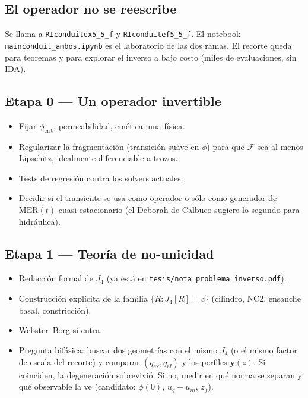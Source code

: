 \documentclass[11pt,a4paper]{article}
\theoremstyle{plain}
\theoremstyle{definition}
\theoremstyle{remark}
\newcommand{\MER}{\mathrm{MER}}
\newcommand{\F}{\mathcal{F}}
\begin{document}
\subsection{El operador no se reescribe}

Se llama a \texttt{RIconduitex5\_5\_f} y \texttt{RIconduitef5\_5\_f}.
El notebook \texttt{mainconduit\_ambos.ipynb} es el laboratorio de
las dos ramas. El recorte queda para teoremas y para explorar el
inverso a bajo costo (miles de evaluaciones, sin IDA).

\subsection{Etapa 0 --- Un operador invertible}

\begin{itemize}
\item Fijar $\phi_{\mathrm{crit}}$, permeabilidad, cinética: una
  física.
\item Regularizar la fragmentación (transición suave en $\phi$)
  para que $\F$ sea al menos Lipschitz, idealmente
  diferenciable a trozos.
\item Tests de regresión contra los solvers actuales.
\item Decidir si el transiente se usa como operador o sólo como
  generador de $\MER(t)$ cuasi-estacionario (el Deborah de
  Calbuco sugiere lo segundo para hidráulica).
\end{itemize}

\subsection{Etapa 1 --- Teoría de no-unicidad}

\begin{itemize}
\item Redacción formal de $J_4$ (ya está en
  \texttt{tesis/nota\_problema\_inverso.pdf}).
\item Construcción explícita de la familia $\{R:J_4[R]=c\}$
  (cilindro, NC2, ensanche basal, constricción).
\item Webster--Borg si entra.
\item Pregunta bifásica: buscar dos geometrías con el mismo
  $J_4$ (o el mismo factor de escala del recorte) y comparar
  $(q_{\mathrm{ex}},q_{\mathrm{ef}})$ y los perfiles
  $\mathbf{y}(z)$. Si coinciden, la degeneración sobrevivió. Si
  no, medir en qué norma se separan y qué observable la ve
  (candidato: $\phi(0)$, $u_g-u_m$, $z_f$).
\end{itemize}
\end{document}
